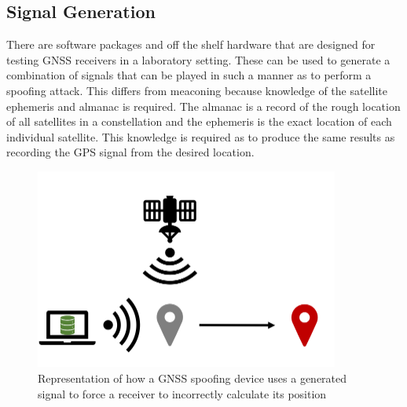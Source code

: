 \subsection{Signal Generation}
There are software packages and off the shelf hardware that are designed for testing GNSS receivers in a laboratory setting. These can be used to generate a combination
of signals that can be
played in such a manner as to perform a spoofing attack. This differs from meaconing because knowledge of the satellite ephemeris and almanac is required. The almanac is
a record of the rough location of all satellites in a constellation and the ephemeris is the exact location of each individual satellite. This knowledge is required as to
produce the same results as recording the GPS signal from the desired location.

\begin{figure}[h]
    \begin{centering}
        \includegraphics[width=10cm, keepaspectratio]{Figures/Spoofing.png}
        \caption{Representation of how a GNSS spoofing device uses a generated signal to force a receiver to incorrectly calculate its position}
    \label{fig:spoofing cartoon}
    \end{centering}
\end{figure}



